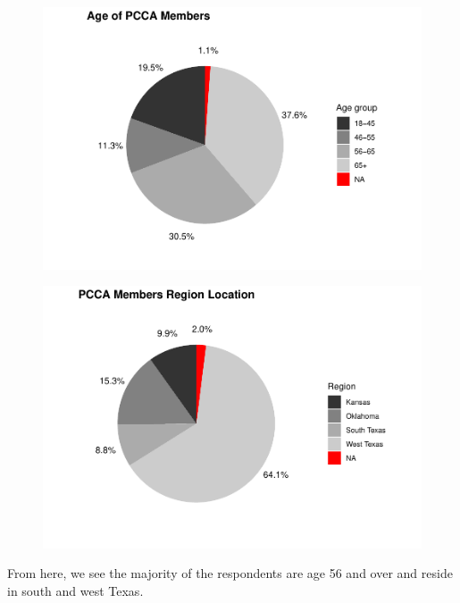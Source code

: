 \documentclass[a4paper]{article}
\begin{document}
\noindent\begin{minipage}{0.5\textwidth}
	\begin{figure}[H]
		\includegraphics[scale=0.6]{survey/pcca_survey_files/figure-latex/age-all-1.pdf}
	\end{figure} 
\end{minipage}%
\begin{minipage}{0.5\textwidth}
	\begin{figure}[H]
		\includegraphics[scale=0.6]{survey/pcca_survey_files/figure-latex/region-all-1.pdf}
	\end{figure}
\end{minipage}

From here, we see the majority of the respondents are age 56 and over and reside in south and west Texas.
\end{document}
